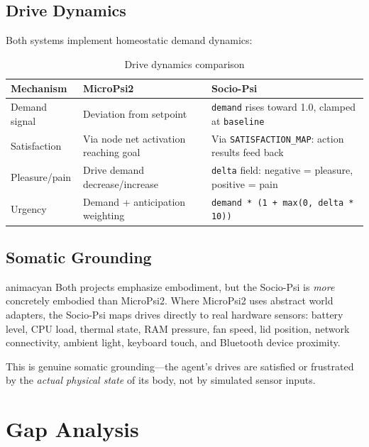 \documentclass[11pt,letterpaper]{article}
\begin{document}
\subsection{Drive Dynamics}

Both systems implement homeostatic demand dynamics:

\begin{table}[H]
\centering
\small\sffamily
\caption{Drive dynamics comparison}
\label{tab:dynamics}
\begin{tabularx}{\textwidth}{l X X}
\toprule
\textbf{Mechanism} & \textbf{MicroPsi2} & \textbf{Socio-Psi} \\
\midrule
Demand signal &
  Deviation from setpoint &
  \texttt{demand} rises toward 1.0, clamped at \texttt{baseline} \\
Satisfaction &
  Via node net activation reaching goal &
  Via \texttt{SATISFACTION\_MAP}: action results feed back \\
Pleasure/pain &
  Drive demand decrease/increase &
  \texttt{delta} field: negative = pleasure, positive = pain \\
Urgency &
  Demand + anticipation weighting &
  \texttt{demand * (1 + max(0, delta * 10))} \\
\bottomrule
\end{tabularx}
\end{table}

\subsection{Somatic Grounding}

\begin{archetype}{animacyan}
Both projects emphasize embodiment, but the Socio-Psi is \emph{more}
concretely embodied than MicroPsi2. Where MicroPsi2 uses abstract world
adapters, the Socio-Psi maps drives directly to real hardware sensors:
battery level, CPU load, thermal state, RAM pressure, fan speed, lid
position, network connectivity, ambient light, keyboard touch, and Bluetooth
device proximity.

This is genuine somatic grounding---the agent's drives are satisfied or
frustrated by the \emph{actual physical state} of its body, not by
simulated sensor inputs.
\end{archetype}

\section{Gap Analysis}
\label{sec:gaps}
\end{document}
